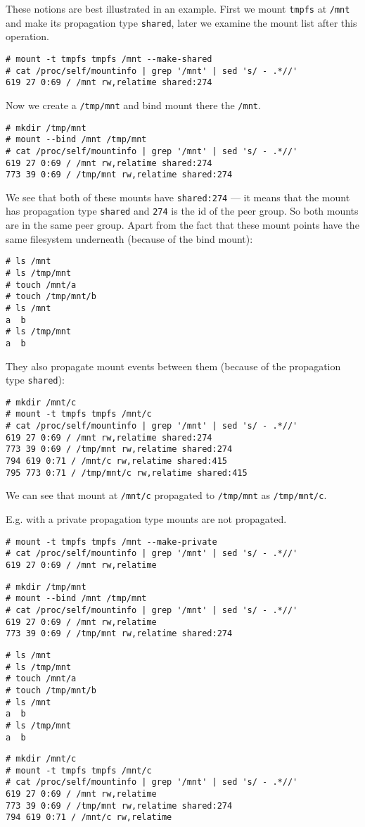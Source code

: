 \documentclass[licencjacka,en]{pracamgr}
\begin{document}
These notions are best illustrated in an example. First we mount \texttt{tmpfs} at \texttt{/mnt} and make its propagation type \texttt{shared}, later we examine the mount list after this operation.
\begin{lstlisting}
# mount -t tmpfs tmpfs /mnt --make-shared
# cat /proc/self/mountinfo | grep '/mnt' | sed 's/ - .*//'
619 27 0:69 / /mnt rw,relatime shared:274
\end{lstlisting}
Now we create a \texttt{/tmp/mnt} and bind mount there the \texttt{/mnt}.
\begin{lstlisting}
# mkdir /tmp/mnt
# mount --bind /mnt /tmp/mnt
# cat /proc/self/mountinfo | grep '/mnt' | sed 's/ - .*//'
619 27 0:69 / /mnt rw,relatime shared:274
773 39 0:69 / /tmp/mnt rw,relatime shared:274
\end{lstlisting}
We see that both of these mounts have \texttt{shared:274} --- it means that the mount has propagation type \texttt{shared} and \texttt{274} is the id of the peer group. So both mounts are in the same peer group.
Apart from the fact that these mount points have the same filesystem underneath (because of the bind mount):
\begin{lstlisting}
# ls /mnt
# ls /tmp/mnt
# touch /mnt/a
# touch /tmp/mnt/b
# ls /mnt
a  b
# ls /tmp/mnt
a  b
\end{lstlisting}
They also propagate mount events between them (because of the propagation type \texttt{shared}):
\begin{lstlisting}
# mkdir /mnt/c
# mount -t tmpfs tmpfs /mnt/c
# cat /proc/self/mountinfo | grep '/mnt' | sed 's/ - .*//'
619 27 0:69 / /mnt rw,relatime shared:274
773 39 0:69 / /tmp/mnt rw,relatime shared:274
794 619 0:71 / /mnt/c rw,relatime shared:415
795 773 0:71 / /tmp/mnt/c rw,relatime shared:415
\end{lstlisting}
We can see that mount at \texttt{/mnt/c} propagated to \texttt{/tmp/mnt} as \texttt{/tmp/mnt/c}.

E.g. with a private propagation type mounts are not propagated.
\begin{lstlisting}
# mount -t tmpfs tmpfs /mnt --make-private
# cat /proc/self/mountinfo | grep '/mnt' | sed 's/ - .*//'
619 27 0:69 / /mnt rw,relatime
\end{lstlisting}
\begin{lstlisting}
# mkdir /tmp/mnt
# mount --bind /mnt /tmp/mnt
# cat /proc/self/mountinfo | grep '/mnt' | sed 's/ - .*//'
619 27 0:69 / /mnt rw,relatime
773 39 0:69 / /tmp/mnt rw,relatime shared:274
\end{lstlisting}
\begin{lstlisting}
# ls /mnt
# ls /tmp/mnt
# touch /mnt/a
# touch /tmp/mnt/b
# ls /mnt
a  b
# ls /tmp/mnt
a  b
\end{lstlisting}
\begin{lstlisting}
# mkdir /mnt/c
# mount -t tmpfs tmpfs /mnt/c
# cat /proc/self/mountinfo | grep '/mnt' | sed 's/ - .*//'
619 27 0:69 / /mnt rw,relatime
773 39 0:69 / /tmp/mnt rw,relatime shared:274
794 619 0:71 / /mnt/c rw,relatime
\end{lstlisting}
\end{document}
